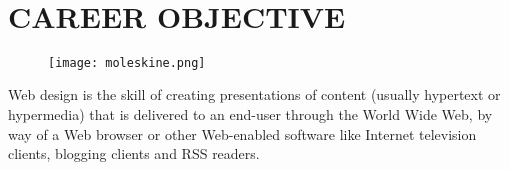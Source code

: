 \documentclass[10pt]{article}
\newcommand{%
	\thumbnail}[2]{
		\raggedleft\hfill{\href{#1}
			{\trick \raisebox{-3pt}{.}
				\fbox{
			\texttt{[image: \#2]}}
			\raisebox{70pt}{.}}}
			}
\begin{document}


{\\[25pt]\par}


\parbox{0.8\textwidth}{ %

	\vspace{0pt}	%
	
\section{CAREER OBJECTIVE}
{\Career 

\begin{wrapfigure}{L}{15mm}
\vspace{-10pt}
\texttt{[image: moleskine.png]}
\end{wrapfigure}


\begin{spacing}{1.4}\Career
Web design is the skill of creating presentations of content (usually hypertext or hypermedia) that is delivered to an end-user through the World Wide Web, by way of a Web browser or other Web-enabled software like Internet television clients, blogging clients and RSS readers.
\end{spacing}

\raggedleft\raisebox{5pt}{\rule{11cm}{1pt}}

}
\vspace{10pt}
}
\end{document}
